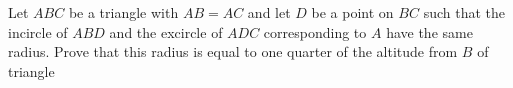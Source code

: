 Let $ABC$ be a triangle with $AB = AC$ and let $D$ be a point on $BC$ such that the incircle of $ABD$ and the excircle of $ADC$ corresponding to $A$ have the same radius. Prove that this radius is equal to one quarter of the altitude from $B$ of triangle 